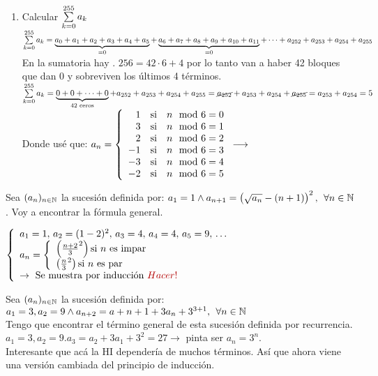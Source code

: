 \begin{enumerate}[label=(\alph*)]
	\item Calcular $\sumatoria{k=0}{255} a_k$ \\
	      $\sumatoria{k=0}{255} a_k =
		      \underbrace{\textstyle a_0 + a_1 + a_2 + a_3 + a_4 + a_5}_{= 0} +
		      \underbrace{\textstyle a_6 + a_7 + a_8 + a_9 + a_{10} + a_{11} }_{=0} +
		      \cdots +
		      a_{252} + a_{253} + a_{254} + a_{255}
	      $\\
	      En la sumatoria hay . $256 = 42 \cdot 6 + 4$ por lo tanto van a haber 42 bloques que dan 0 y sobreviven los últimos 4 términos.
	      $\sumatoria{k=0}{255} a_k = \underbrace{\textstyle 0 + 0 + \dots + 0}_{42 \text{ ceros}} + a_{252} + a_{253} + a_{254} + a_{255} =
		      \cancel{a_{252}} + a_{253} + a_{254} + \cancel{a_{255}} = a_{253} + a_{254} = 5\\
	      $ Donde usé que: $a_n =
		      \llave{rcl}{
			      1 & \text{si} & n\mod6 = 0 \\
			      3 & \text{si} & n\mod6 = 1 \\
			      2 & \text{si} & n\mod6 = 2 \\
			      -1 & \text{si} & n\mod6 = 3 \\
			      -3 & \text{si} & n\mod6 = 4 \\
			      -2 & \text{si} & n\mod6 = 5 \\
		      }\longrightarrow
	      $
	       \Tilde
\end{enumerate}

\separador

Sea $(a_n)_{n\en \naturales}$ la sucesión definida por:
$a_1 = 1 \y a_{n+1} = \parentesis{\sqrt{a_n} - (n+1)}^2, \, \paratodo n \en \naturales$.
Voy a encontrar la fórmula general.

$
	\llave{ l }{
		a_1 = 1,\, a_2 = (1 - 2)^2,\, a_3 = 4,\, a_4 = 4,\, a_5 = 9,\, \dots\\
		a_n =
		\llave{l}{
			\parentesis{\frac{n+2}{3}^2} \text{si $n$ es impar}\\
			\parentesis{\frac{n}{3}^2} \text{si $n$ es par}\\
		}\\
		\to \text{ Se muestra por inducción } \hacer\\
	}$


\separador

Sea $(a_n)_{n\en \naturales}$ la sucesión definida por: $a_1 = 3, a_2 = 9 \y a_{n+2} = a+{n+1}+ 3a_n +3^{3+1},\, \paratodo n \en \naturales$\\
Tengo que encontrar el término general de esta  sucesión definida por recurrencia.
$a_1 =3, a_2 = 9. a_3 = a_2 + 3a_1 + 3^2=27 \to$ pinta ser $a_n = 3^n$. \\
Interesante que acá la HI dependería de muchos términos. Así que ahora viene una versión
cambiada del principio de inducción.\\

